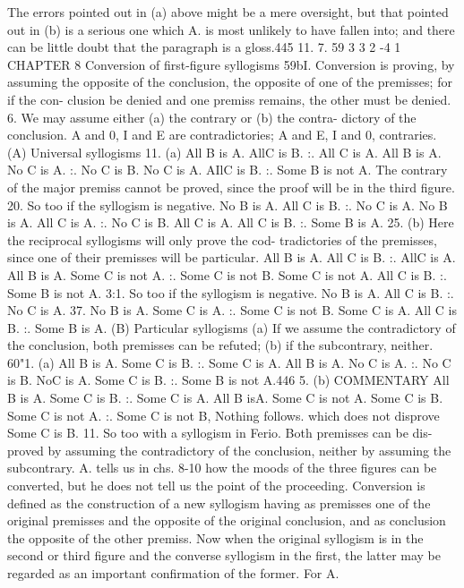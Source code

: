 {{{The errors pointed out in (a) above might be a mere oversight,
but that pointed out in (b) is a serious one which A. is most
unlikely to have fallen into; and there can be little doubt that the
paragraph is a gloss.445
11. 7. 59 3 3 2 -4 1
CHAPTER 8
Conversion of first-figure syllogisms
59bI. Conversion is proving, by assuming the opposite of the
conclusion, the opposite of one of the premisses; for if the con-
clusion be denied and one premiss remains, the other must be
denied.
6. We may assume either (a) the contrary or (b) the contra-
dictory of the conclusion. A and 0, I and E are contradictories;
A and E, I and 0, contraries.
(A) Universal syllogisms
11.
(a)
All B is A.
AllC is B.
:. All C is A.
All B is A.
No C is A.
:. No C is B.
No C is A.
AIlC is B.
:. Some B is not A.
The contrary of the major premiss cannot be proved, since the
proof will be in the third figure.
20. So too if the syllogism is negative.
No B is A.
All C is B.
:. No C is A.
No B is A.
All C is A.
:. No C is B.
All C is A.
All C is B.
:. Some B is A.
25. (b) Here the reciprocal syllogisms will only prove the cod-
tradictories of the premisses, since one of their premisses will be
particular.
All B is A.
All C is B.
:. AllC is A.
All B is A.
Some C is not A.
:. Some C is not B.
Some C is not A.
All C is B.
:. Some B is not A.
3:1. So too if the syllogism is negative.
No B is A.
All C is B.
:. No C is A.
37.
No B is A.
Some C is A.
:. Some C is not B.
Some C is A.
All C is B.
:. Some B is A.
(B) Particular syllogisms
(a) If we assume the contradictory of the conclusion, both
premisses can be refuted;
(b) if the subcontrary, neither.
60"1. (a)
All B is A.
Some C is B.
:. Some C is A.
All B is A.
No C is A.
:. No C is B.
NoC is A.
Some C is B.
:. Some B is not A.446
5. (b)
COMMENTARY
All B is A.
Some C is B.
:. Some C is A.
All B isA.
Some C is not A.
Some C is B.
Some C is not A.
:. Some C is not B,
Nothing follows.
which does not disprove
Some C is B.
11. So too with a syllogism in Ferio. Both premisses can be dis-
proved by assuming the contradictory of the conclusion, neither
by assuming the subcontrary.
A. tells us in chs. 8-10 how the moods of the three figures can be
converted, but he does not tell us the point of the proceeding.
Conversion is defined as the construction of a new syllogism having
as premisses one of the original premisses and the opposite of the
original conclusion, and as conclusion the opposite of the other
premiss. Now when the original syllogism is in the second or
third figure and the converse syllogism in the first, the latter may
be regarded as an important confirmation of the former. For A.
}}}
